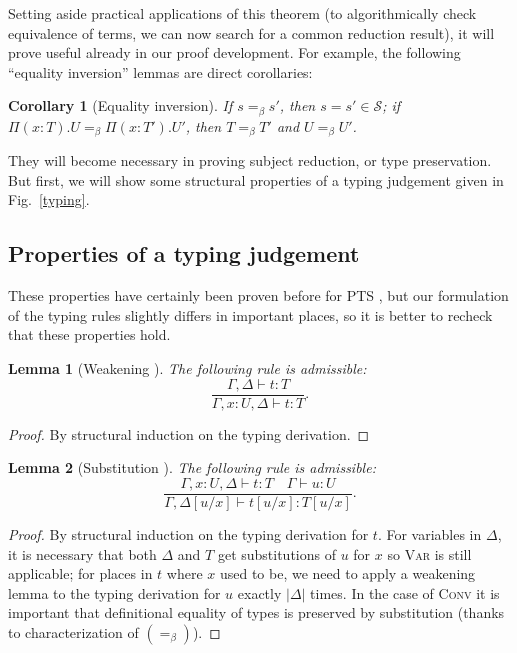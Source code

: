 \documentclass{article}
\newtheorem{lemma}{Lemma}
\newtheorem{corollary}{Corollary}
\theoremstyle{definition}
\theoremstyle{remark}
\begin{document}
Setting aside practical applications of this theorem
(to algorithmically check equivalence of terms, we can
now search for a common reduction result), it will
prove useful already in our proof development. For
example, the following ``equality inversion'' lemmas
are direct corollaries:

\begin{corollary}[Equality inversion]
    If $s=_\beta s'$, then $s=s'\in\mathcal{S}$; if
    $\Pi(x:T).U=_\beta\Pi(x:T').U'$, then $T=_\beta T'$
    and $U=_\beta U'$.
\end{corollary}

They will become necessary in proving subject
reduction, or type preservation. But first, we will
show some structural properties of a typing judgement
given in Fig.~\ref{typing}.

\subsection{Properties of a typing judgement}

These properties have certainly been proven before for
PTS \cite{barendregt1992lambda,geuvers1991modular}, but
our formulation of the typing rules slightly differs in
important places, so it is better to recheck that these
properties hold.

\begin{lemma}[Weakening ]
    The following rule is admissible:
    \[\dfrac{\Gamma,\Delta\vdash t:T}
            {\Gamma,x:U,\Delta\vdash t:T}.\]
\end{lemma}
\begin{proof}
    By structural induction on the typing derivation.
\end{proof}

\begin{lemma}[Substitution ]
    The following rule is admissible:
    \[\dfrac{
        \Gamma,x:U,\Delta\vdash t:T\quad
        \Gamma\vdash u:U
    }{\Gamma,\Delta[u/x]\vdash t[u/x]:T[u/x]}.\]
\end{lemma}
\begin{proof}
    By structural induction on the typing derivation
    for $t$. For variables in $\Delta$, it is necessary
    that both $\Delta$ and $T$ get substitutions of $u$
    for $x$ so \textsc{Var} is still applicable; for
    places in $t$ where $x$ used to be, we need to
    apply a weakening lemma to the typing derivation
    for $u$ exactly $|\Delta|$ times. In the case of
    \textsc{Conv} it is important that definitional
    equality of types is preserved by substitution
    (thanks to characterization of $(=_\beta)$).
\end{proof}
\end{document}
